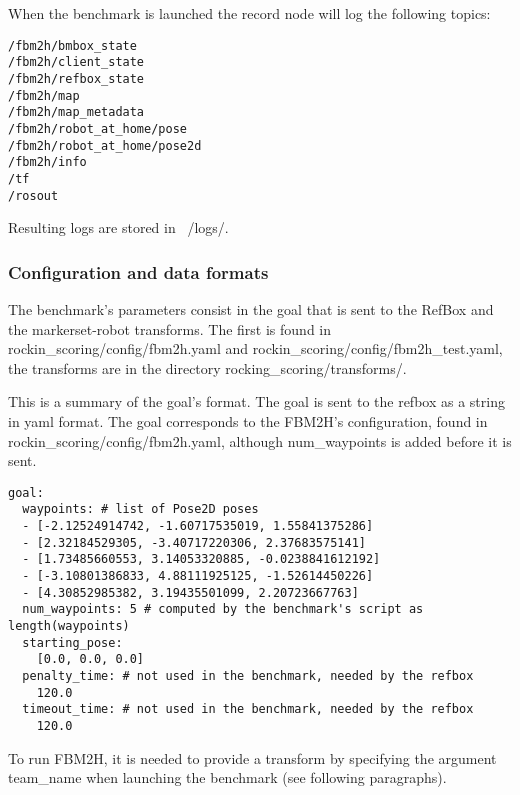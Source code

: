 \documentclass[a4paper]{article}
\begin{document}
\label{sec:fbm2h record node}

When the benchmark is launched the record node will log the following topics:

\begin{verbatim}
/fbm2h/bmbox_state
/fbm2h/client_state
/fbm2h/refbox_state
/fbm2h/map
/fbm2h/map_metadata
/fbm2h/robot_at_home/pose
/fbm2h/robot_at_home/pose2d
/fbm2h/info
/tf
/rosout
\end{verbatim} 

Resulting logs are stored in ~/logs/.

\clearpage

\subsubsection{Configuration and data formats}

The benchmark's parameters consist in the goal that is sent to the RefBox and the markerset-robot transforms.
The first is found in rockin_scoring/config/fbm2h.yaml and rockin_scoring/config/fbm2h_test.yaml, the transforms are in the directory rocking_scoring/transforms/.


\label{sec:Goal data format}

This is a summary of the goal's format. The goal is sent to the refbox as a string in yaml format.
The goal corresponds to the FBM2H's configuration, found in rockin_scoring/config/fbm2h.yaml, although num_waypoints is added before it is sent.

\begin{verbatim}
goal:
  waypoints: # list of Pose2D poses
  - [-2.12524914742, -1.60717535019, 1.55841375286]
  - [2.32184529305, -3.40717220306, 2.37683575141]
  - [1.73485660553, 3.14053320885, -0.0238841612192]
  - [-3.10801386833, 4.88111925125, -1.52614450226]
  - [4.30852985382, 3.19435501099, 2.20723667763]
  num_waypoints: 5 # computed by the benchmark's script as length(waypoints)
  starting_pose:
    [0.0, 0.0, 0.0]
  penalty_time: # not used in the benchmark, needed by the refbox
    120.0
  timeout_time: # not used in the benchmark, needed by the refbox
    120.0
\end{verbatim} 


\label{sec:Transform data format}

To run FBM2H, it is needed to provide a transform by specifying the argument team_name when launching the benchmark (see following paragraphs).
\end{document}
